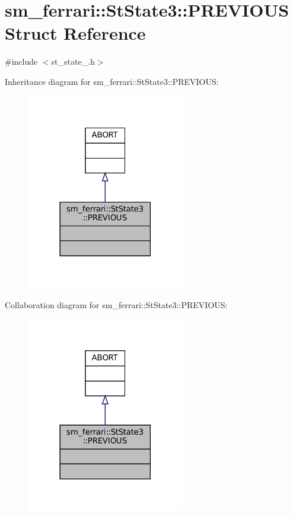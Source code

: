 \hypertarget{structsm__ferrari_1_1StState3_1_1PREVIOUS}{}\section{sm\+\_\+ferrari\+:\+:St\+State3\+:\+:P\+R\+E\+V\+I\+O\+US Struct Reference}
\label{structsm__ferrari_1_1StState3_1_1PREVIOUS}


{\ttfamily \#include $<$st\+\_\+state\+\_.\+h$>$}



Inheritance diagram for sm\+\_\+ferrari\+:\+:St\+State3\+:\+:P\+R\+E\+V\+I\+O\+US\+:
\nopagebreak
\begin{figure}[H]
\begin{center}
\leavevmode
\includegraphics[width=194pt]{structsm__ferrari_1_1StState3_1_1PREVIOUS__inherit__graph}
\end{center}
\end{figure}


Collaboration diagram for sm\+\_\+ferrari\+:\+:St\+State3\+:\+:P\+R\+E\+V\+I\+O\+US\+:
\nopagebreak
\begin{figure}[H]
\begin{center}
\leavevmode
\includegraphics[width=194pt]{structsm__ferrari_1_1StState3_1_1PREVIOUS__coll__graph}
\end{center}
\end{figure}


